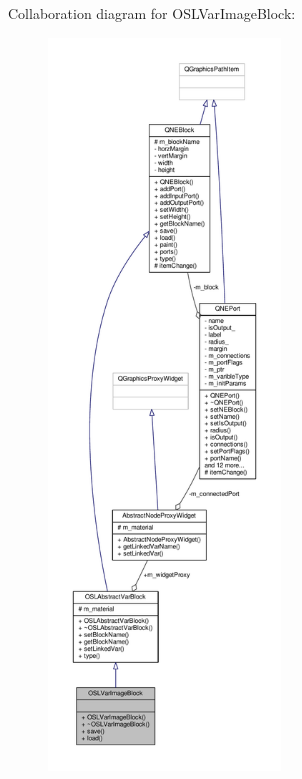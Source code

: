 Collaboration diagram for O\-S\-L\-Var\-Image\-Block\-:
\nopagebreak
\begin{figure}[H]
\begin{center}
\leavevmode
\includegraphics[height=550pt]{class_o_s_l_var_image_block__coll__graph}
\end{center}
\end{figure}
